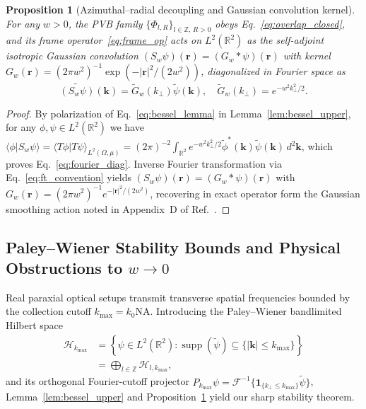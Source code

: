 \documentclass[aps,pra,reprint,amsmath,amssymb,floatfix,longbibliography]{revtex4-2}
\providecommand{\braket}[2]{\langle#1\vert#2\rangle}
\providecommand{\abs}[1]{\lvert#1\rvert}
\newtheorem{proposition}{Proposition}
\begin{document}
\begin{proposition}[Azimuthal--radial decoupling and Gaussian convolution kernel]
\label{prop:conv_kernel}
For any $w > 0$, the PVB family $\{\Phi_{l,R}\}_{l\in\mathbb{Z},\,R>0}$ obeys Eq.~\eqref{eq:overlap_closed}, and its frame operator~\eqref{eq:frame_op} acts on $L^2(\mathbb{R}^2)$ as the self-adjoint isotropic Gaussian convolution $(S_w\psi)(\mathbf{r}) = (G_w * \psi)(\mathbf{r})$ with kernel $G_w(\mathbf{r}) = (2\pi w^2)^{-1}\exp(-\abs{\mathbf{r}}^2/(2w^2))$, diagonalized in Fourier space as
\begin{equation}
\widetilde{(S_w\psi)}(\mathbf{k}) = \widetilde{G}_w(k_\perp)\widetilde{\psi}(\mathbf{k}), \quad \widetilde{G}_w(k_\perp) = e^{-w^2 k_\perp^2/2}.
\label{eq:fourier_diag}
\end{equation}
\end{proposition}
\begin{proof}
By polarization of Eq.~\eqref{eq:bessel_lemma} in Lemma~\ref{lem:bessel_upper}, for any $\phi,\psi \in L^2(\mathbb{R}^2)$ we have $\braket{\phi}{S_w\psi} = \braket{T\phi}{T\psi}_{L^2(\Omega,\mu)} = (2\pi)^{-2}\int_{\mathbb{R}^2} e^{-w^2 k_\perp^2/2}\widetilde{\phi}^*(\mathbf{k})\widetilde{\psi}(\mathbf{k})\,d^2\mathbf{k}$, which proves Eq.~\eqref{eq:fourier_diag}. Inverse Fourier transformation via Eq.~\eqref{eq:ft_convention} yields $(S_w\psi)(\mathbf{r}) = (G_w * \psi)(\mathbf{r})$ with $G_w(\mathbf{r}) = (2\pi w^2)^{-1}e^{-\abs{\mathbf{r}}^2/(2w^2)}$, recovering in exact operator form the Gaussian smoothing action noted in Appendix~D of Ref.~\cite{Ferreira2026}.
\end{proof}

\subsection{Paley--Wiener Stability Bounds and Physical Obstructions to \texorpdfstring{$w \to 0$}{w -> 0}}
\label{subsec:paley_wiener}

Real paraxial optical setups transmit transverse spatial frequencies bounded by the collection cutoff $k_{\max} = k_0 \mathrm{NA}$. Introducing the Paley--Wiener bandlimited Hilbert space
\begin{align}
\mathcal{H}_{k_{\max}} &= \left\{\psi \in L^2(\mathbb{R}^2) : \operatorname{supp}(\widetilde{\psi}) \subseteq \{\abs{\mathbf{k}} \le k_{\max}\}\right\} \nonumber \\
&= \bigoplus_{l\in\mathbb{Z}} \mathcal{H}_{l,k_{\max}},
\label{eq:paley_wiener}
\end{align}
and its orthogonal Fourier-cutoff projector $P_{k_{\max}}\psi = \mathcal{F}^{-1}\{\mathbf{1}_{\{k_\perp \le k_{\max}\}}\widetilde{\psi}\}$, Lemma~\ref{lem:bessel_upper} and Proposition~\ref{prop:conv_kernel} yield our sharp stability theorem.
\end{document}
